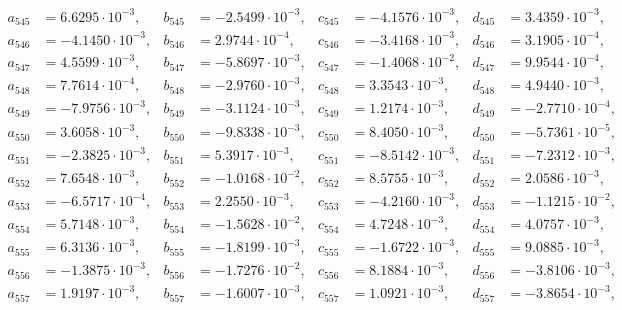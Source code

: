 \begin{align*}
  a_{ 545 } &= 6.6295 \cdot 10^{ -3 }, & b_{ 545 } &= -2.5499 \cdot 10^{ -3 }, & c_{ 545 } &= -4.1576 \cdot 10^{ -3 }, & d_{ 545 } &= 3.4359 \cdot 10^{ -3 }, \\ 
  a_{ 546 } &= -4.1450 \cdot 10^{ -3 }, & b_{ 546 } &= 2.9744 \cdot 10^{ -4 }, & c_{ 546 } &= -3.4168 \cdot 10^{ -3 }, & d_{ 546 } &= 3.1905 \cdot 10^{ -4 }, \\ 
  a_{ 547 } &= 4.5599 \cdot 10^{ -3 }, & b_{ 547 } &= -5.8697 \cdot 10^{ -3 }, & c_{ 547 } &= -1.4068 \cdot 10^{ -2 }, & d_{ 547 } &= 9.9544 \cdot 10^{ -4 }, \\ 
  a_{ 548 } &= 7.7614 \cdot 10^{ -4 }, & b_{ 548 } &= -2.9760 \cdot 10^{ -3 }, & c_{ 548 } &= 3.3543 \cdot 10^{ -3 }, & d_{ 548 } &= 4.9440 \cdot 10^{ -3 }, \\ 
  a_{ 549 } &= -7.9756 \cdot 10^{ -3 }, & b_{ 549 } &= -3.1124 \cdot 10^{ -3 }, & c_{ 549 } &= 1.2174 \cdot 10^{ -3 }, & d_{ 549 } &= -2.7710 \cdot 10^{ -4 }, \\ 
  a_{ 550 } &= 3.6058 \cdot 10^{ -3 }, & b_{ 550 } &= -9.8338 \cdot 10^{ -3 }, & c_{ 550 } &= 8.4050 \cdot 10^{ -3 }, & d_{ 550 } &= -5.7361 \cdot 10^{ -5 }, \\ 
  a_{ 551 } &= -2.3825 \cdot 10^{ -3 }, & b_{ 551 } &= 5.3917 \cdot 10^{ -3 }, & c_{ 551 } &= -8.5142 \cdot 10^{ -3 }, & d_{ 551 } &= -7.2312 \cdot 10^{ -3 }, \\ 
  a_{ 552 } &= 7.6548 \cdot 10^{ -3 }, & b_{ 552 } &= -1.0168 \cdot 10^{ -2 }, & c_{ 552 } &= 8.5755 \cdot 10^{ -3 }, & d_{ 552 } &= 2.0586 \cdot 10^{ -3 }, \\ 
  a_{ 553 } &= -6.5717 \cdot 10^{ -4 }, & b_{ 553 } &= 2.2550 \cdot 10^{ -3 }, & c_{ 553 } &= -4.2160 \cdot 10^{ -3 }, & d_{ 553 } &= -1.1215 \cdot 10^{ -2 }, \\ 
  a_{ 554 } &= 5.7148 \cdot 10^{ -3 }, & b_{ 554 } &= -1.5628 \cdot 10^{ -2 }, & c_{ 554 } &= 4.7248 \cdot 10^{ -3 }, & d_{ 554 } &= 4.0757 \cdot 10^{ -3 }, \\ 
  a_{ 555 } &= 6.3136 \cdot 10^{ -3 }, & b_{ 555 } &= -1.8199 \cdot 10^{ -3 }, & c_{ 555 } &= -1.6722 \cdot 10^{ -3 }, & d_{ 555 } &= 9.0885 \cdot 10^{ -3 }, \\ 
  a_{ 556 } &= -1.3875 \cdot 10^{ -3 }, & b_{ 556 } &= -1.7276 \cdot 10^{ -2 }, & c_{ 556 } &= 8.1884 \cdot 10^{ -3 }, & d_{ 556 } &= -3.8106 \cdot 10^{ -3 }, \\ 
  a_{ 557 } &= 1.9197 \cdot 10^{ -3 }, & b_{ 557 } &= -1.6007 \cdot 10^{ -3 }, & c_{ 557 } &= 1.0921 \cdot 10^{ -3 }, & d_{ 557 } &= -3.8654 \cdot 10^{ -3 }, \\ 

\end{align*}
